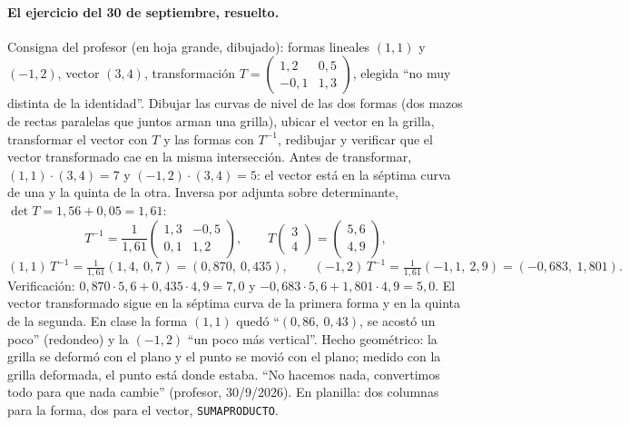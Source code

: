 \paragraph{El ejercicio del 30 de septiembre, resuelto.} Consigna del profesor (en hoja
grande, dibujado): formas lineales \((1,1)\) y \((-1,2)\), vector \((3,4)\), transformación
\(T=\begin{pmatrix}1{,}2&0{,}5\\-0{,}1&1{,}3\end{pmatrix}\), elegida ``no muy distinta de
la identidad''. Dibujar las curvas de nivel de las dos formas (dos mazos de rectas
paralelas que juntos arman una grilla), ubicar el vector en la grilla, transformar el
vector con \(T\) y las formas con \(T^{-1}\), redibujar y verificar que el vector
transformado cae en la misma intersección. Antes de transformar, \((1,1)\cdot(3,4)=7\) y
\((-1,2)\cdot(3,4)=5\): el vector está en la séptima curva de una y la quinta de la otra.
Inversa por adjunta sobre determinante, \(\det T=1{,}56+0{,}05=1{,}61\):
\[
  T^{-1}=\frac1{1{,}61}\begin{pmatrix}1{,}3&-0{,}5\\0{,}1&1{,}2\end{pmatrix},\qquad
  T\begin{pmatrix}3\\4\end{pmatrix}=\begin{pmatrix}5{,}6\\4{,}9\end{pmatrix},
\]
\[
  (1,1)\,T^{-1}=\tfrac1{1{,}61}(1{,}4,\ 0{,}7)=(0{,}870,\ 0{,}435),\qquad
  (-1,2)\,T^{-1}=\tfrac1{1{,}61}(-1{,}1,\ 2{,}9)=(-0{,}683,\ 1{,}801).
\]
Verificación: \(0{,}870\cdot5{,}6+0{,}435\cdot4{,}9=7{,}0\) y
\(-0{,}683\cdot5{,}6+1{,}801\cdot4{,}9=5{,}0\). El vector transformado sigue en la séptima
curva de la primera forma y en la quinta de la segunda. En clase la forma \((1,1)\)
quedó ``\((0{,}86,\ 0{,}43)\), se acostó un poco'' (redondeo) y la \((-1,2)\) ``un poco más
vertical''. Hecho geométrico: la grilla se deformó con el plano y el punto se movió con el
plano; medido con la grilla deformada, el punto está donde estaba. ``No hacemos nada,
convertimos todo para que nada cambie'' (profesor, 30/9/2026). En planilla: dos columnas
para la forma, dos para el vector, \texttt{SUMAPRODUCTO}.

